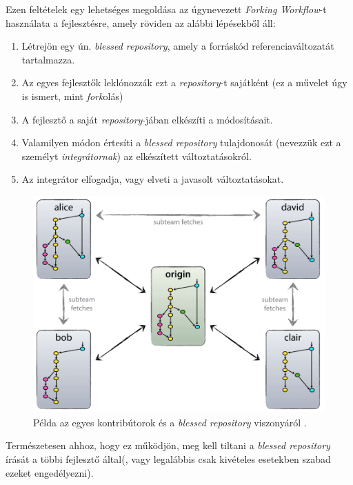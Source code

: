 Ezen feltételek egy lehetséges megoldása az úgynevezett \emph{Forking Workflow}-t használata
a fejlesztésre, amely röviden az alábbi lépésekből áll:
\begin{enumerate}
    \item{Létrejön egy ún. \emph{blessed repository}, amely a forráskód referenciaváltozatát
        tartalmazza.}
    \item{Az egyes fejlesztők leklónozzák ezt a \emph{repository}-t sajátként (ez a művelet úgy is
        ismert, mint \emph{fork}olás)}
    \item{A fejlesztő a saját \emph{repository}-jában elkészíti a módosításait.}
    \item{Valamilyen módon értesíti a \emph{blessed repository} tulajdonosát
        (nevezzük ezt a személyt \emph{integrátornak}) az elkészített változtatásokról.}
    \item{Az integrátor elfogadja, vagy elveti a javasolt változtatásokat.}
\end{enumerate}

\begin{figure}[h]
    \centering
    \includegraphics[width=\textwidth, height=0.25\textheight,
    keepaspectratio]{figures/forkingworkflow.png}
    \caption{Példa az egyes kontribútorok és a \emph{blessed repository} viszonyáról
    \cite{driessen2010successful}.}
\end{figure}
\FloatBarrier

Természetesen ahhoz, hogy ez működjön, meg kell tiltani a \emph{blessed repository} írását a többi
fejlesztő által(, vagy legalábbis csak kivételes esetekben szabad ezeket engedélyezni).

